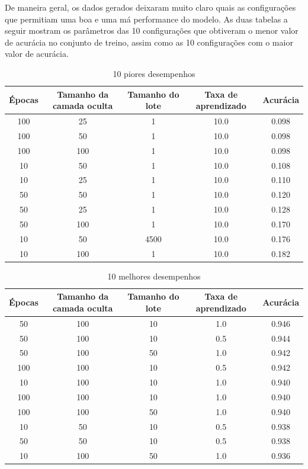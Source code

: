 \documentclass{article}
\begin{document}
De maneira geral, os dados gerados deixaram muito claro quais as configurações que permitiam uma boa e uma má performance do modelo. As duas tabelas a seguir mostram os parâmetros das 10 configurações que obtiveram o menor valor de acurácia no conjunto de treino, assim como as 10 configurações com o maior valor de acurácia.

\begin{table}[H]
    \centering
        \captionsetup{labelformat=empty} 
        \caption{10 piores desempenhos}
        \begin{tabular}{| c c c c c |}
        \hline
        Épocas & Tamanho da camada oculta & Tamanho do lote & Taxa de aprendizado & Acurácia \\
        \hline
            100 &  25 &    1 & 10.0 & 0.098 \\
            100 &  50 &    1 & 10.0 & 0.098 \\
            100 & 100 &    1 & 10.0 & 0.098 \\
            10 &  50 &    1 & 10.0 & 0.108 \\
            10 &  25 &    1 & 10.0 & 0.110 \\
            50 &  50 &    1 & 10.0 & 0.120 \\
            50 &  25 &    1 & 10.0 & 0.128 \\
            50 & 100 &    1 & 10.0 & 0.170 \\
            10 &  50 & 4500 & 10.0 & 0.176 \\
            10 & 100 &    1 & 10.0 & 0.182 \\
        \hline
        \end{tabular}
\end{table}

\begin{table}[H]
    \centering
        \captionsetup{labelformat=empty} 
        \caption{10 melhores desempenhos}
        \begin{tabular}{| c c c c c |}
        \hline
        Épocas & Tamanho da camada oculta & Tamanho do lote & Taxa de aprendizado & Acurácia \\
        \hline
            50 & 100 & 10 & 1.0 & 0.946 \\
            50 & 100 & 10 & 0.5 & 0.944 \\
            50 & 100 & 50 & 1.0 & 0.942 \\
            100 & 100 & 10 & 0.5 & 0.942 \\
            10 & 100 & 10 & 1.0 & 0.940 \\
            100 & 100 & 10 & 1.0 & 0.940 \\
            100 & 100 & 50 & 1.0 & 0.940 \\
            10 &  50 & 10 & 0.5 & 0.938 \\
            50 &  50 & 10 & 0.5 & 0.938 \\
            10 & 100 & 50 & 1.0 & 0.936 \\
        \hline
        \end{tabular}
\end{table}
\end{document}
